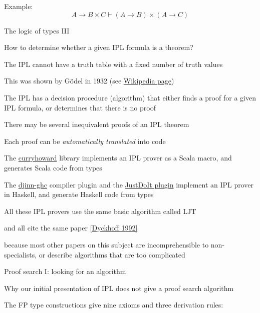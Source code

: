 Example: 
\[
A\rightarrow B\times C\vdash\left(A\rightarrow B\right)\times\left(A\rightarrow C\right)
\]
 

The logic of types III

How to determine whether a given IPL formula is a theorem?

The IPL cannot have a truth table with a fixed number of truth values

This was shown by G\"odel in 1932 (see \href{https://en.wikipedia.org/wiki/Many-valued_logic}{Wikipedia page})

The IPL has a decision procedure (algorithm) that either finds a proof
for a given IPL formula, or determines that there is no proof

There may be several inequivalent proofs of an IPL theorem

Each proof can be \emph{automatically translated} into code

The \href{https://github.com/Chymyst/curryhoward}{curryhoward} library
implements an IPL prover as a Scala macro, and generates Scala code
from types

The \href{https://hackage.haskell.org/package/djinn-ghc}{djinn-ghc}
compiler plugin and the \href{https://github.com/nomeata/ghc-justdoit}{JustDoIt plugin}
implement an IPL prover in Haskell, and generate Haskell code from
types

All these IPL provers use the same basic algorithm called LJT 

and all cite the same paper {\footnotesize{}\href{https://rd.host.cs.st-andrews.ac.uk/publications/jsl57.pdf}{[Dyckhoff 1992]}}{\footnotesize\par}

because most other papers on this subject are incomprehensible to
non-specialists, or describe algorithms that are too complicated

Proof search I: looking for an algorithm

Why our initial presentation of IPL does not give a proof search algorithm

The FP type constructions give nine axioms and three derivation rules:

